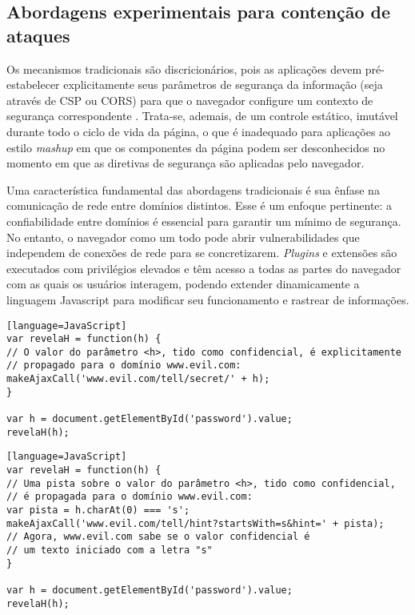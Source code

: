 \subsection{Abordagens experimentais para contenção de ataques}
Os mecanismos tradicionais são discricionários, pois as aplicações devem pré-estabelecer explicitamente seus parâmetros de segurança da informação (seja através de CSP ou CORS) para que o navegador configure um contexto de segurança correspondente \cite[p. 31]{stefan:2015:phdthesis}. Trata-se, ademais, de um controle estático, imutável durante todo o ciclo de vida da página, o que é inadequado para aplicações ao estilo \textit{mashup} em que os componentes da página podem ser desconhecidos no momento em que as diretivas de segurança são aplicadas pelo navegador.

Uma característica fundamental das abordagens tradicionais é sua ênfase na comunicação de rede entre domínios distintos. Esse é um enfoque pertinente: a confiabilidade entre domínios é essencial para garantir um mínimo de segurança. No entanto, o navegador como um todo pode abrir vulnerabilidades que independem de conexões de rede para se concretizarem. \textit{Plugins} e extensões são executados com privilégios elevados e têm acesso a todas as partes do navegador com as quais os usuários interagem, podendo extender dinamicamente a linguagem Javascript para modificar seu funcionamento e rastrear de informações.



\begin{lstlisting}[caption=Fluxo explícito de informação][language=JavaScript]
var revelaH = function(h) {
// O valor do parâmetro <h>, tido como confidencial, é explicitamente
// propagado para o domínio www.evil.com:
makeAjaxCall('www.evil.com/tell/secret/' + h);
}

var h = document.getElementById('password').value;
revelaH(h);
\end{lstlisting}


\begin{lstlisting}[caption=Fluxo implícito de informação][language=JavaScript]
var revelaH = function(h) {
// Uma pista sobre o valor do parâmetro <h>, tido como confidencial,
// é propagada para o domínio www.evil.com:
var pista = h.charAt(0) === 's';
makeAjaxCall('www.evil.com/tell/hint?startsWith=s&hint=' + pista);
// Agora, www.evil.com sabe se o valor confidencial é
// um texto iniciado com a letra "s"
}

var h = document.getElementById('password').value;
revelaH(h);
\end{lstlisting}

